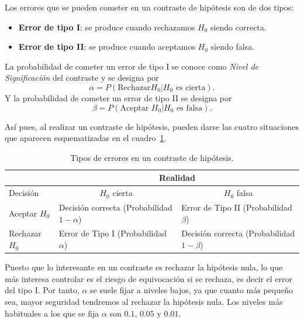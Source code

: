 Los errores que se pueden cometer en un contraste de hipótesis son
de dos tipos:

\begin{itemize}
    \item \textbf{Error de tipo I}: se produce cuando rechazamos $H_0$
    siendo correcta.
    \item \textbf{Error de tipo II}: se produce cuando aceptamos $H_0$
    siendo falsa.
\end{itemize}

La probabilidad de cometer un error de tipo I se conoce como \emph{Nivel de
Significación} del contraste y se designa por \[ \alpha=P(\textrm{Rechazar
}H_0|H_0\textrm{ es cierta}).\] Y la probabilidad de cometer un error de tipo
II se designa por \[\beta=P(\textrm{Aceptar }H_0|H_0\textrm{ es falsa}).\]

Así pues, al realizar un contraste de hipótesis, pueden darse las cuatro
situaciones que aparecen esquematizadas en el cuadro~\ref{t:errores}.

\begin{table}[h!]
\centering
\begin{tabular}{|m{2.5cm}|m{3.5cm}|m{3.5cm}|}
\cline{2-3}
\multicolumn{1}{l|}{} & \multicolumn{2}{c|}{Realidad} \\
\hline
Decisión & \multicolumn{1}{c|}{$H_0$ cierta} & \multicolumn{1}{c|}{$H_0$ falsa} \\
\hline
Aceptar $H_0$ & \multicolumn{1}{m{3.5cm}|}{\centering Decisión correcta \newline (Probabilidad $1-\alpha$) } &
\multicolumn{1}{m{3.5cm}|}{\centering Error de Tipo II \newline (Probabilidad $\beta$)} \\
\hline
Rechazar $H_0$ & \multicolumn{1}{m{3.5cm}|}{\centering Error de Tipo I \newline (Probabilidad $\alpha$)} & \multicolumn{1}{m{3.5cm}|}{\centering Decisión correcta \newline (Probabilidad $1-\beta$)} \\
\hline
\end{tabular}
\caption{Tipos de errores en un contraste de hipótesis.} \label{t:errores}
\end{table}



Puesto que lo interesante en un contraste es rechazar la hipótesis nula, lo
que más interesa controlar es el riesgo de equivocación si se rechaza, es
decir el error del tipo I. Por tanto, $\alpha$ se suele fijar a niveles bajos,
ya que cuanto más pequeño sea, mayor seguridad tendremos al rechazar la
hipótesis nula. Los niveles más habituales a los que se fija $\alpha$ son
$0.1$, $0.05$ y $0.01$.

